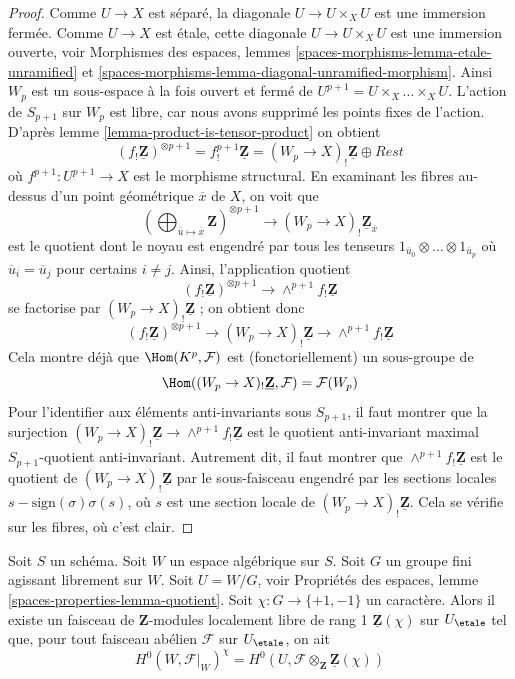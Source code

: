 \begin{proof}
Comme $U \to X$ est séparé, la diagonale $U \to U \times_X U$ est une
immersion fermée. Comme $U \to X$ est étale, cette diagonale
$U \to U \times_X U$ est une immersion ouverte, voir
Morphismes des espaces, lemmes
\ref{spaces-morphisms-lemma-etale-unramified} et
\ref{spaces-morphisms-lemma-diagonal-unramified-morphism}.
Ainsi $W_p$ est un sous-espace à la fois ouvert et fermé de
$U^{p + 1} = U \times_X \ldots \times_X U$. L'action de $S_{p + 1}$
sur $W_p$ est libre, car nous avons supprimé les points fixes de l'action.
D'après
lemme \ref{lemma-product-is-tensor-product}
on obtient
$$
(f_!\underline{\mathbf{Z}})^{\otimes p + 1} =
f^{p + 1}_!\underline{\mathbf{Z}} = (W_p \to X)_!\underline{\mathbf{Z}}
\oplus Rest
$$
où $f^{p + 1} : U^{p + 1} \to X$ est le morphisme structural.
En examinant les fibres au-dessus d'un point géométrique $\overline{x}$ de $X$,
on voit que
$$
\left(
\bigoplus\nolimits_{\overline{u} \mapsto \overline{x}} \mathbf{Z}
\right)^{\otimes p + 1}
\longrightarrow
(W_p \to X)_!\underline{\mathbf{Z}}_{\overline{x}}
$$
est le quotient dont le noyau est engendré par tous les tenseurs
$1_{\overline{u}_0} \otimes \ldots \otimes 1_{\overline{u}_p}$
où $\overline{u}_i = \overline{u}_j$ pour certains $i \not = j$.
Ainsi, l'application quotient
$$
(f_!\underline{\mathbf{Z}})^{\otimes p + 1}
\longrightarrow
\wedge^{p + 1}f_!\underline{\mathbf{Z}}
$$
se factorise par $(W_p \to X)_!\underline{\mathbf{Z}}$ ; on obtient donc
$$
(f_!\underline{\mathbf{Z}})^{\otimes p + 1}
\longrightarrow
(W_p \to X)_!\underline{\mathbf{Z}}
\longrightarrow
\wedge^{p + 1}f_!\underline{\mathbf{Z}}
$$
Cela montre déjà que $\Hom(K^p, \mathcal{F})$ est (fonctoriellement) un
sous-groupe de
$$
\Hom((W_p \to X)_!\underline{\mathbf{Z}}, \mathcal{F}) = \mathcal{F}(W_p)
$$
Pour l'identifier aux éléments anti-invariants sous $S_{p + 1}$, il faut montrer que
la surjection $(W_p \to X)_!\underline{\mathbf{Z}}
\to \wedge^{p + 1}f_!\underline{\mathbf{Z}}$ est le quotient anti-invariant maximal
$S_{p + 1}$-quotient anti-invariant. Autrement dit, il faut montrer que
$\wedge^{p + 1}f_!\underline{\mathbf{Z}}$ est le quotient de
$(W_p \to X)_!\underline{\mathbf{Z}}$ par le sous-faisceau engendré par
les sections locales $s - \text{sign}(\sigma)\sigma(s)$, où $s$ est
une section locale de $(W_p \to X)_!\underline{\mathbf{Z}}$.
Cela se vérifie sur les fibres, où c'est clair.
\end{proof}

\begin{lemma}
\label{lemma-twist}
Soit $S$ un schéma. Soit $W$ un espace algébrique sur $S$.
Soit $G$ un groupe fini agissant librement sur $W$.
Soit $U = W/G$, voir
Propriétés des espaces, lemme \ref{spaces-properties-lemma-quotient}.
Soit $\chi : G \to \{+1, -1\}$ un caractère.
Alors il existe un faisceau de $\mathbf{Z}$-modules localement libre de rang 1
$\underline{\mathbf{Z}}(\chi)$ sur $U_\etale$ tel que, pour tout
faisceau abélien $\mathcal{F}$ sur $U_\etale$, on ait
$$
H^0(W, \mathcal{F}|_W)^\chi =
H^0(U, \mathcal{F} \otimes_{\mathbf{Z}} \underline{\mathbf{Z}}(\chi))
$$
\end{lemma}

